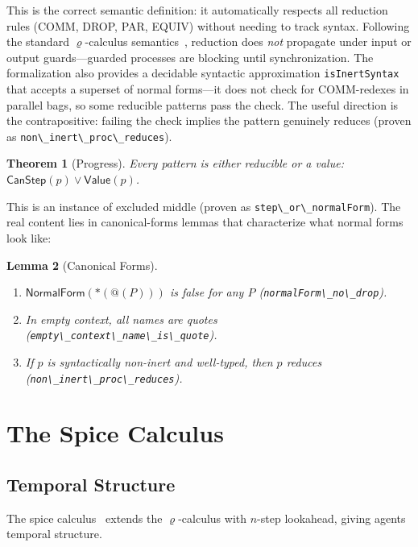 \documentclass[11pt,a4paper]{article}
\makeatletter
\newtheorem{theorem}{Theorem}[section]
\newtheorem{lemma}[theorem]{Lemma}
\theoremstyle{definition}
\theoremstyle{remark}
\renewcommand{\rho}{\varrho}
\newcommand{\pquote}[1]{@(#1)}
\newcommand{\pdrop}[1]{*(#1)}
\newcommand{\lean}[1]{\lstinline[language=Lean4]{#1}}
\makeatother
\begin{document}
This is the correct semantic definition: it automatically respects all reduction
rules (COMM, DROP, PAR, EQUIV) without needing to track syntax.
Following the standard $\rho$-calculus semantics~\cite{meredith2005},
reduction does \emph{not} propagate under input or output guards---guarded
processes are blocking until synchronization.
The formalization also provides a decidable syntactic approximation
\lean{isInertSyntax} that accepts a superset of normal forms---it does not
check for COMM-redexes in parallel bags, so some reducible patterns pass the
check. The useful direction is the contrapositive: failing the check implies
the pattern genuinely reduces (proven as \lean{non\_inert\_proc\_reduces}).

\begin{theorem}[Progress]
\label{thm:progress}
Every pattern is either reducible or a value:
$\mathsf{CanStep}(p) \lor \mathsf{Value}(p)$.
\end{theorem}

This is an instance of excluded middle (proven as \lean{step\_or\_normalForm}).
The real content lies in canonical-forms lemmas that characterize what normal forms
look like:

\begin{lemma}[Canonical Forms]
\label{lem:canonical}
\begin{enumerate}[nosep]
  \item $\mathsf{NormalForm}(\pdrop{\pquote{P}})$ is false for any $P$
    (\lean{normalForm\_no\_drop}).
  \item In empty context, all names are quotes (\lean{empty\_context\_name\_is\_quote}).
  \item If $p$ is syntactically non-inert and well-typed, then $p$ reduces
    (\lean{non\_inert\_proc\_reduces}).
\end{enumerate}
\end{lemma}

\section{The Spice Calculus}
\label{sec:spice}

\subsection{Temporal Structure}

The spice calculus~\cite{meredith2026spice} extends the $\rho$-calculus with
$n$-step lookahead, giving agents temporal structure.
\end{document}
